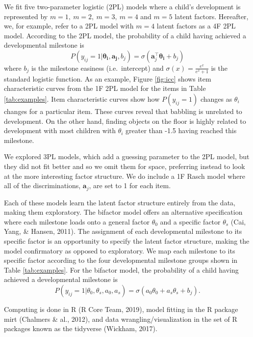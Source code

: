 \documentclass[10pt, letterpaper]{article}
\begin{document}
We fit five two-parameter logistic (2PL) models where a child's
development is represented by \(m = 1, \ m = 2, \ m = 3, \ m = 4\) and
\(m = 5\) latent factors. Hereafter, we, for example, refer to a 2PL
model with \(m = 4\) latent factors as a 4F 2PL model. According to the
2PL model, the probability of a child having achieved a developmental
milestone is \[
P(y_{ij} = 1 | \boldsymbol{\theta_i}, \boldsymbol{a_j}, b_j) = \sigma(\boldsymbol{a}_{j}^{\top}\boldsymbol{\theta_i} + b_j)
\] where \(b_j\) is the milestone easiness (i.e.~intercept) and
\(\sigma(x) = \frac{e^x}{e^x + 1}\) is the standard logistic function.
As an example, Figure \ref{fig:icc} shows item characteristic curves
from the 1F 2PL model for the items in Table \ref{tab:examples}. Item
characteristic curves show how \(P(y_{ij} = 1)\) changes as \(\theta_i\)
changes for a particular item. These curves reveal that babbling is
unrelated to development. On the other hand, finding objects on the
floor is highly related to development with most children with
\(\theta_i\) greater than -1.5 having reached this milestone.

We explored 3PL models, which add a guessing parameter to the 2PL model,
but they did not fit better and so we omit them for space, preferring
instead to look at the more interesting factor structure. We do include
a 1F Rasch model where all of the discriminations,
\(\boldsymbol{a}_{j}\), are set to 1 for each item.

Each of these models learn the latent factor structure entirely from the
data, making them exploratory. The bifactor model offers an alternative
specification where each milestone loads onto a general factor
\(\theta_0\) and a specific factor \(\theta_s\) (Cai, Yang, \& Hansen,
2011). The assignment of each developmental milestone to its specific
factor is an opportunity to specify the latent factor structure, making
the model confirmatory as opposed to exploratory. We map each milestone
to its specific factor according to the four developmental milestone
groups shown in Table \ref{tab:examples}. For the bifactor model, the
probability of a child having achieved a developmental milestone is \[
P(y_{ij} = 1 | \theta_0, \theta_s, a_0, a_s) = \sigma(a_0\theta_0 + a_s\theta_s + b_j).
\]

Computing is done in R (R Core Team, 2019), model fitting in the R
package mirt (Chalmers \& al., 2012), and data wrangling/visualization
in the set of R packages known as the tidyverse (Wickham, 2017).
\end{document}
